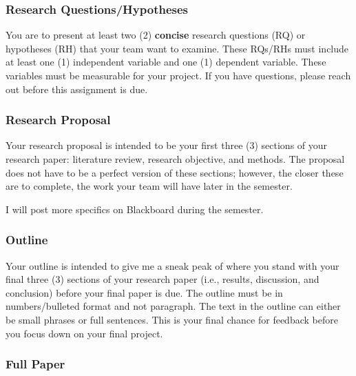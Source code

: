 \documentclass[
  b5paper]{book}
\begin{document}
\hypertarget{research-questionshypotheses}{%
\subsubsection*{Research Questions/Hypotheses}\label{research-questionshypotheses}}

You are to present at least two (2) \textbf{concise} research questions (RQ) or hypotheses (RH) that your team want to examine. These RQs/RHs must include at least one (1) independent variable and one (1) dependent variable. These variables must be measurable for your project. If you have questions, please reach out before this assignment is due.

\hypertarget{research-proposal}{%
\subsubsection*{Research Proposal}\label{research-proposal}}

Your research proposal is intended to be your first three (3) sections of your research paper: literature review, research objective, and methods. The proposal does not have to be a perfect version of these sections; however, the closer these are to complete, the work your team will have later in the semester.

I will post more specifics on Blackboard during the semester.

\hypertarget{outline}{%
\subsubsection*{Outline}\label{outline}}

Your outline is intended to give me a sneak peak of where you stand with your final three (3) sections of your research paper (i.e., results, discussion, and conclusion) before your final paper is due. The outline must be in numbers/bulleted format and not paragraph. The text in the outline can either be small phrases or full sentences. This is your final chance for feedback before you focus down on your final project.

\hypertarget{full-paper}{%
\subsubsection*{Full Paper}\label{full-paper}}
\end{document}
